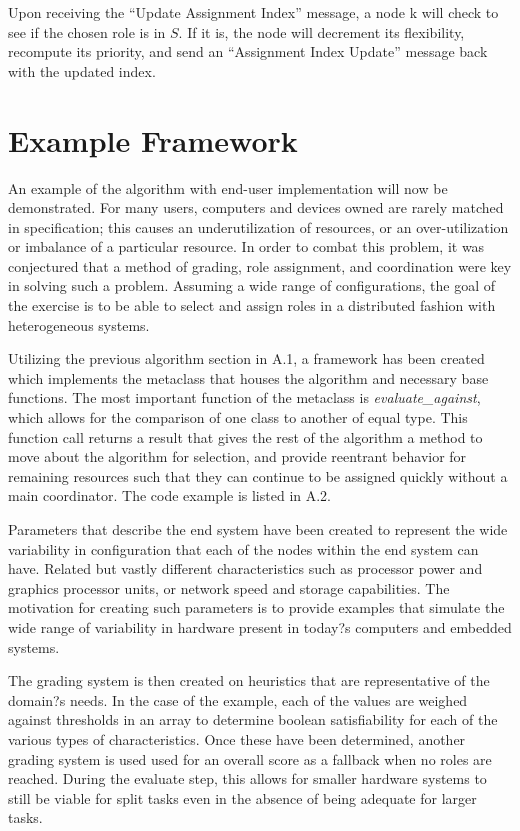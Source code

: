 \documentclass[11pt]{article}
\begin{document}
\begin{multicols}{2}
Upon receiving the ``Update Assignment Index'' message, a node k will check to see if the chosen role is in $S$. If it is, the node will decrement its flexibility, recompute its priority, and send an ``Assignment Index Update'' message back with the updated index.

\section{Example Framework}
An example of the algorithm with end-user implementation will now be demonstrated.  For many users, computers and devices owned are rarely matched in specification; this causes an underutilization of resources, or an over-utilization or imbalance of a particular resource.  In order to combat this problem, it was conjectured that a method of grading, role assignment, and coordination were key in solving such a problem.  Assuming a wide range of configurations, the goal of the exercise is to be able to select and assign roles in a distributed fashion with heterogeneous systems.  

Utilizing the previous algorithm section in A.1, a framework has been created which implements the metaclass that houses the algorithm and necessary base functions.  The most important function of the metaclass is \textit{evaluate\_against}, which allows for the comparison of one class to another of equal type.  This function call returns a result that gives the rest of the algorithm a method to move about the algorithm for selection, and provide reentrant behavior for remaining resources such that they can continue to be assigned quickly without a main coordinator.  The code example is listed in A.2.

Parameters that describe the end system have been created to represent the wide variability in configuration that each of the nodes within the end system can have.  Related but vastly different characteristics such as processor power and graphics processor units, or network speed and storage capabilities.  The motivation for creating such parameters is to provide examples that simulate the wide range of variability in hardware present in today?s computers and embedded systems.  

The grading system is then created on heuristics that are representative of the domain?s needs.  In the case of the example, each of the values are weighed against thresholds in an array to determine boolean satisfiability for each of the various types of characteristics.  Once these have been determined, another grading system is used used for an overall score as a fallback when no roles are reached.  During the evaluate step, this allows for smaller hardware systems to still be viable for split tasks even in the absence of being adequate for larger tasks.  


\end{multicols}
\end{document}
